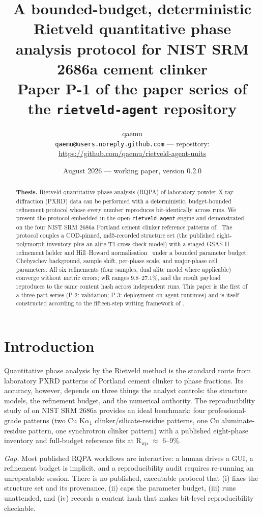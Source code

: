 \documentclass[11pt,a4paper]{article}
\title{\textbf{A bounded-budget, deterministic Rietveld quantitative phase
analysis protocol for NIST SRM 2686a cement clinker}\\
\large Paper P-1 of the paper series of the
\texttt{rietveld-agent} repository}
\author{qaemu\\
\small \texttt{qaemu@users.noreply.github.com} --- repository:
\url{https://github.com/qaemu/rietveld-agent-units}}
\date{August 2026 --- working paper, version 0.2.0}
\begin{document}
\maketitle

\begin{abstract}
\noindent \textbf{Thesis.} Rietveld quantitative phase analysis (RQPA) of
laboratory powder X-ray diffraction (PXRD) data can be performed with a
deterministic, budget-bounded refinement protocol whose every number
reproduces bit-identically across runs. We present the protocol embedded
in the open \texttt{rietveld-agent} engine and demonstrated on the four
NIST SRM 2686a Portland cement clinker reference patterns of
\cite{garcia-mate2024srms}. The protocol couples a COD-pinned, md5-recorded
structure set (the published eight-polymorph inventory plus an alite T1
cross-check model) with a staged GSAS-II~\cite{toby2013gsas2} refinement
ladder and Hill--Howard normalisation~\cite{hill1987normalization} under a
bounded parameter budget: Chebyschev background, sample shift, per-phase
scale, and major-phase cell parameters. All six refinements (four samples,
dual alite model where applicable) converge without metric errors; wR
ranges 9.8--27.1\%, and the result payload reproduces to the same content
hash across independent runs. This paper is the first of a three-part
series (P-2: validation; P-3: deployment on agent runtimes) and is itself
constructed according to the fifteen-step writing framework of
\cite{drake2025fifteen}.
\end{abstract}

\section{Introduction}
Quantitative phase analysis by the Rietveld method is the standard route
from laboratory PXRD patterns of Portland cement clinker to phase
fractions. Its accuracy, however, depends on three things the analyst
controls: the structure models, the refinement budget, and the numerical
authority. The reproducibility study of \cite{garcia-mate2024srms} on NIST
SRM 2686a provides an ideal benchmark: four professional-grade patterns
(two Cu K$\alpha_1$ clinker/silicate-residue patterns, one Cu
aluminate-residue pattern, one synchrotron clinker pattern) with a
published eight-phase inventory and full-budget reference fits at
R$_\mathrm{wp}$ $\approx$ 6--9\%.

\emph{Gap.} Most published RQPA workflows are interactive: a human drives
a GUI, a refinement budget is implicit, and a reproducibility audit
requires re-running an unrepeatable session. There is no published,
executable protocol that (i) fixes the structure set and its provenance,
(ii) caps the parameter budget, (iii) runs unattended, and (iv) records a
content hash that makes bit-level reproducibility checkable.
\end{document}

